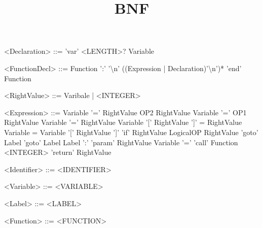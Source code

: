 \documentclass{article}
\title{BNF}
\begin{document}
\setlength{\grammarindent}{8em} %
\begin{grammar}

<Declaration> ::= 'var' <LENGTH>? Variable

<FunctionDecl> ::= Function ':' '\textbackslash n' ((Expression | Declaration)'\textbackslash n')* 'end' Function

<RightValue> ::= Varibale | <INTEGER>

<Expression>	::=	Variable '=' RightValue OP2 RightValue
\alt Variable '=' OP1 RightValue
\alt Variable '=' RightValue
\alt Variable '[' RightValue ']' = RightValue
\alt Variable = Variable '[' RightValue ']'
\alt 'if' RightValue LogicalOP RightValue 'goto' Label
\alt 'goto' Label
\alt Label ':'
\alt 'param' RightValue
\alt Variable '=' 'call' Function <INTEGER>
\alt 'return' RightValue


<Identifier>	::=	<IDENTIFIER>

<Variable> ::= <VARIABLE>

<Label> ::= <LABEL>

<Function> ::= <FUNCTION>

\end{grammar}
\end{document}
